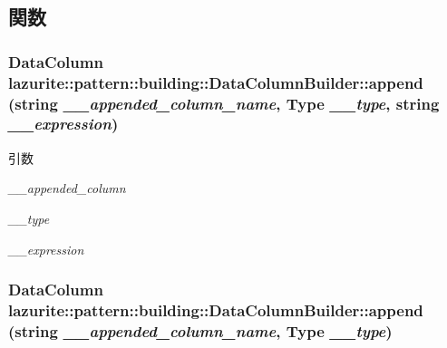 \subsection{関数}
\hypertarget{classlazurite_1_1pattern_1_1building_1_1_data_column_builder_a86a98b1af1ae16dc1b7944575b328521}{
\subsubsection[{append}]{\setlength{\rightskip}{0pt plus 5cm}DataColumn lazurite::pattern::building::DataColumnBuilder::append (string {\em \_\-\_\-appended\_\-column\_\-name}, \/  Type {\em \_\-\_\-type}, \/  string {\em \_\-\_\-expression})}}
\label{classlazurite_1_1pattern_1_1building_1_1_data_column_builder_a86a98b1af1ae16dc1b7944575b328521}

\begin{DoxyParams}{引数}
\item[{\em \_\-\_\-appended\_\-column}]\item[{\em \_\-\_\-type}]\item[{\em \_\-\_\-expression}]\end{DoxyParams}
\hypertarget{classlazurite_1_1pattern_1_1building_1_1_data_column_builder_a0bfb1d32a8d779f85a12f40a093dd6ea}{
\subsubsection[{append}]{\setlength{\rightskip}{0pt plus 5cm}DataColumn lazurite::pattern::building::DataColumnBuilder::append (string {\em \_\-\_\-appended\_\-column\_\-name}, \/  Type {\em \_\-\_\-type})}}
\label{classlazurite_1_1pattern_1_1building_1_1_data_column_builder_a0bfb1d32a8d779f85a12f40a093dd6ea}

